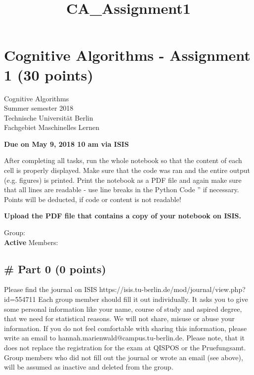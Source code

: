 \documentclass[11pt]{article}
\title{CA\_Assignment1}
\begin{document}
    
    
    \maketitle
    
    

    
    \section{Cognitive Algorithms - Assignment 1 (30
points)}\label{cognitive-algorithms---assignment-1-30-points}

Cognitive Algorithms\\
Summer semester 2018\\
Technische Universität Berlin\\
Fachgebiet Maschinelles Lernen

\textbf{Due on May 9, 2018 10 am via ISIS }

After completing all tasks, run the whole notebook so that the content
of each cell is properly displayed. Make sure that the code was ran and
the entire output (e.g. figures) is printed. Print the notebook as a PDF
file and again make sure that all lines are readable - use line breaks
in the Python Code '' if necessary. Points will be deducted, if code or
content is not readable!

\textbf{Upload the PDF file that contains a copy of your notebook on
ISIS.}

    Group:\\
\textbf{Active} Members:

    \subsection{\# Part 0 (0 points)}\label{part-0-0-points}

Please find the journal on ISIS
https://isis.tu-berlin.de/mod/journal/view.php?id=554711 Each group
member should fill it out individually. It asks you to give some
personal information like your name, course of study and aspired degree,
that we need for statistical reasons. We will not share, misuse or abuse
your information. If you do not feel comfortable with sharing this
information, please write an email to
hannah.marienwald@campus.tu-berlin.de. Please note, that it does not
replace the registration for the exam at QISPOS or the Pruefungsamt.\\
Group members who did not fill out the journal or wrote an email (see
above), will be assumed as inactive and deleted from the group.
\end{document}
